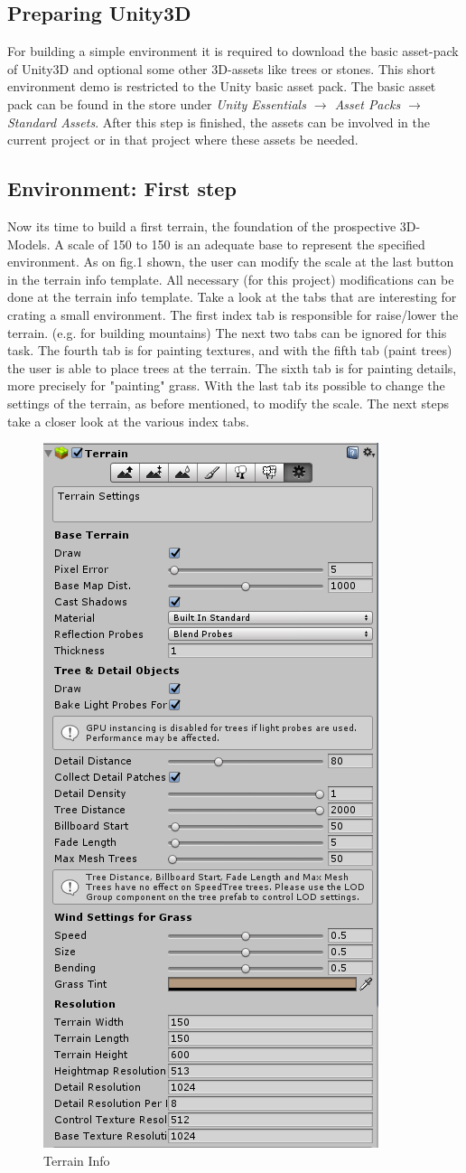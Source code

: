 \documentclass[conference]{IEEEtran}
\begin{document}
\subsection{Preparing Unity3D}

For building a simple environment it is required to download the basic asset-pack of Unity3D and optional some other 3D-assets like trees or stones. This short environment demo is restricted to the Unity basic asset pack. The basic asset pack can be found in the store under \emph{Unity Essentials $\rightarrow$ Asset Packs $\rightarrow$ Standard Assets}.
After this step is finished, the assets can be involved in the current project or in that project where these assets be needed.

 
\subsection{Environment: First step}

Now its time to build a first terrain, the foundation of the prospective 3D-Models. A scale of 150 to 150 is an adequate base to represent the specified environment. As on fig.1 shown, the user can modify the scale at the last button in the terrain info template. All necessary (for this project) modifications can be done at the terrain info template. Take a look at the tabs that are interesting for crating a small environment. The first index tab is responsible for raise/lower the terrain. (e.g. for building mountains) The next two tabs can be ignored for this task. The fourth tab is for painting textures, and with the fifth tab (paint trees) the user is able to place trees at the terrain. The sixth tab is for painting details, more precisely for "painting" grass. With the last tab its possible to change the settings of the terrain, as before mentioned, to modify the scale. The next steps take a closer look at the various index tabs.
\begin{figure}[htbp]
  \includegraphics[width=.4\textwidth]{pictures/terrain_info}
  \caption{Terrain Info}
  \label{fig:terrain_info}
\end{figure}
\end{document}
